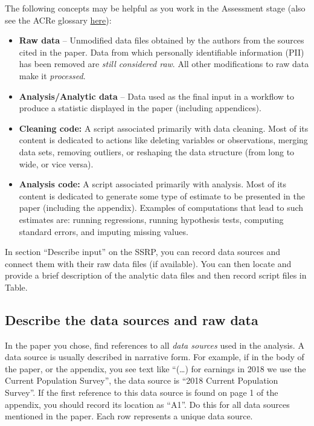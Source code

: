 \documentclass[
]{book}
\providecommand{\tightlist}{%
  \setlength{\itemsep}{0pt}\setlength{\parskip}{0pt}}
\begin{document}
The following concepts may be helpful as you work in the Assessment stage (also see the ACRe glossary \href{https://bitss.github.io/ACRE/definitions.html}{here}):

\begin{itemize}
\tightlist
\item
  \textbf{Raw data} -- Unmodified data files obtained by the authors from the sources cited in the paper. Data from which personally identifiable information (PII) has been removed are \emph{still considered raw}. All other modifications to raw data make it \emph{processed}.\\
\item
  \textbf{Analysis/Analytic data} -- Data used as the final input in a workflow to produce a statistic displayed in the paper (including appendices).\\
\item
  \textbf{Cleaning code:} A script associated primarily with data cleaning. Most of its content is dedicated to actions like deleting variables or observations, merging data sets, removing outliers, or reshaping the data structure (from long to wide, or vice versa).\\
\item
  \textbf{Analysis code:} A script associated primarily with analysis. Most of its content is dedicated to generate some type of estimate to be presented in the paper (including the appendix). Examples of computations that lead to such estimates are: running regressions, running hypothesis tests, computing standard errors, and imputing missing values.
\end{itemize}

In section ``Describe input'' on the SSRP, you can record data sources and connect them with their raw data files (if available). You can then locate and provide a brief description of the analytic data files and then record script files in Table.

\hypertarget{desc-sourc}{%
\subsection{Describe the data sources and raw data}\label{desc-sourc}}

In the paper you chose, find references to all \emph{data sources} used in the analysis. A data source is usually described in narrative form. For example, if in the body of the paper, or the appendix, you see text like ``(\ldots) for earnings in 2018 we use the Current Population Survey'', the data source is ``2018 Current Population Survey''. If the first reference to this data source is found on page 1 of the appendix, you should record its location as ``A1''. Do this for all data sources mentioned in the paper. Each row represents a unique data source.
\end{document}
